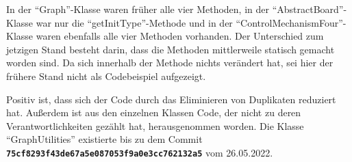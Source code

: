 \noindent In der \enquote{Graph}-Klasse waren früher alle vier Methoden, in der \enquote{AbstractBoard}-Klasse war nur die \enquote{getInitType}-Methode und in der \enquote{ControlMechanismFour}-Klasse waren ebenfalls alle vier Methoden vorhanden. Der Unterschied zum jetzigen Stand besteht darin, dass die Methoden mittlerweile statisch gemacht worden sind. Da sich innerhalb der Methode nichts verändert hat, sei hier der frühere Stand nicht als Codebeispiel aufgezeigt.

Positiv ist, dass sich der Code durch das Eliminieren von Duplikaten reduziert hat. Außerdem ist aus den einzelnen Klassen Code, der nicht zu deren Verantwortlichkeiten gezählt hat, herausgenommen worden. Die Klasse \enquote{GraphUtilities} existierte bis zu dem Commit \textbf{\texttt{75cf8293f43de67a5e087053f9a0e3cc762132a5}} vom 26.05.2022.